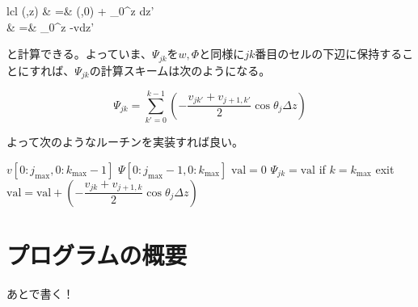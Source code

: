 \documentclass[ja=standard,xelatex]{bxjsarticle}
\newcommand{\vs}[1]{\vskip#1\baselineskip}
\newcommand{\neqn}[1]{\begin{equation}{#1}\end{equation}}
\newcommand{\neqns}[2]{\begin{IEEEeqnarray}{#1}#2\end{IEEEeqnarray}}
\newcommand{\neqnsequal}{\; =\;}
\newcommand{\pdif}[2]{\dfrac{\partial{#1}}{\partial#2}}
\newcommand{\dint}{\displaystyle\int}
\newcommand{\dsum}{\displaystyle\sum}
\newcommand{\bracketnormal}[1]{\left(#1\right)}
\begin{document}
\neqns{lcl}{
  \Psi\bracketnormal{\theta,z} &\neqnsequal& \Psi\bracketnormal{\theta,0} + \dint_0^z \pdif{\Psi}{z}dz'\\
  &\neqnsequal & \dint_0^z -v\cos\theta dz'
}

と計算できる。よっていま、$\Psi_{jk}$を$w,\Phi$と同様に$jk$番目のセルの下辺に保持することにすれば、$\Psi_{jk}$の計算スキームは次のようになる。

\neqn{
  \Psi_{jk} = \dsum_{k'=0}^{k-1} \bracketnormal{-\dfrac{v_{jk'}+v_{j+1,k'}}{2}\cos\theta_j\Delta z}
}

よって次のようなルーチンを実装すれば良い。
\vs{0.5}

\begin{algorithm}[H]
  \caption*{\textbf{subroutine:} calculate\_stream\_function}
  \begin{algorithmic}[1]
    \Require $v[0:j_\text{max},0:k_\text{max}-1]$
    \Ensure $\Psi[0:j_\text{max}-1,0:k_\text{max}]$
    \Statex
    \State $\text{val}=0$
    \State $\Psi_{jk}=\text{val}$
    \State if $k=k_\text{max}$ exit
    \State $\text{val}=\text{val}+\bracketnormal{-\dfrac{v_{jk}+v_{j+1,k}}{2}\cos\theta_j\Delta z}$
    \EndDo
    \EndDo
    
  \end{algorithmic}
\end{algorithm}



\section{プログラムの概要}
{\color{red}あとで書く！}
\end{document}
